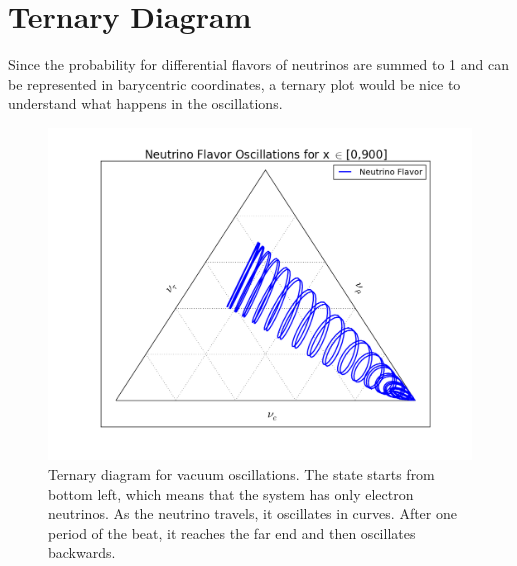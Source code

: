 \documentclass[letterpaper,12pt,english]{sphinxmanual}
\begin{document}
\section{Ternary Diagram}
\label{vacuum:ternary-diagram}
Since the probability for differential flavors of neutrinos are summed to 1 and can be represented in barycentric coordinates, a ternary plot would be nice to understand what happens in the oscillations.
\begin{figure}[htbp]
\centering
\capstart

\includegraphics{vacOsc3FlavorTernary900.png}
\caption{Ternary diagram for vacuum oscillations. The state starts from bottom left, which means that the system has only electron neutrinos. As the neutrino travels, it oscillates in curves. After one period of the beat, it reaches the far end and then oscillates backwards.}\end{figure}
\end{document}
